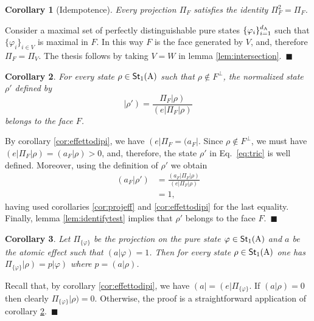 \documentclass[12pt,aps,pra,showpacs,groupedaddress]{revtex4-1}
\newtheorem{corollary}{Corollary} \newtheorem{theorem}{Theorem}
\def\Proof{\medskip\par\noindent{\bf Proof. }}
\def\qed{$\,\blacksquare$\par}
\def\Stset{{\mathsf{St}}}
\def\K#1{\left|#1\right)}  \def\B#1{\left(#1\right|}
\def\SC#1#2{\left(#1\right|\left.\!#2\right)}  \def\Tr{{\rm Tr}}
\begin{document}
\begin{corollary}[Idempotence]
  Every projection $\Pi_F$ satisfies the identity
  $\Pi_F^2=\Pi_F$.
  \label{cor:squareproj}
\end{corollary}

\Proof Consider a maximal set of perfectly distinguishable pure states $\{\varphi_i\}_{i=1}^{d_{\rm A}}$
such that $\{\varphi_i\}_{i\in V}$ is maximal in $F$. In this way $F$ is the face generated by $V$,
and, therefore $\Pi_F=\Pi_V$. The thesis follows by taking $V = W$ in lemma \ref{lem:intersection}.  \qed





\begin{corollary}
  For every state $\rho \in \Stset_1 (\rA)$ such that $\rho\not\in F^\perp$, the normalized state
  $\rho'$ defined by
  \begin{equation}
    \K{\rho'} = \frac{\Pi_F  \K \rho}{\B e \Pi_F  \K \rho} 
    \label{eq:tric}
  \end{equation}  belongs to the face $F$.  
  \label{cor:projrho}
\end{corollary}
\Proof By corollary \ref{cor:effettodipi}, we have $\B e \Pi_F =
(a_F|$.  Since $\rho\not\in F^\perp$, we must have
$(e|\Pi_F|\rho)=(a_F|\rho)>0$, and, therefore, the state $\rho'$ in Eq.~\eqref{eq:tric} is well
defined. Moreover, using the definition of $\rho'$ we obtain 
\begin{align*}
\SC {a_F} {\rho'} &= \frac{\B {a_F} \Pi_F \K \rho}{ \B e \Pi_F \K{\rho}}\\
&=1,  
\end{align*}
having used corollaries  \ref{cor:projeff} and \ref{cor:effettodipi} for the last equality.
Finally, lemma
\ref{lem:identifytest} implies that $\rho' $ belongs to the face $F$.
\qed



\begin{corollary}\label{cor:postproj}
  Let $\Pi_{\{\varphi\}}$ be the projection on the pure state $\varphi \in\Stset_1(\rA)$ and $a$ be the atomic effect such that $\SC {a}{\varphi}=1$. Then for
  every state $\rho \in\Stset_1(\rA)$ one has $\Pi_{\{\varphi\}}
  \K{\rho} =  p \K{\varphi} $ where $p =\SC {a} \rho$.
\end{corollary}
\Proof Recall that, by corollary \ref{cor:effettodipi}, we have $\B {a}  =  \B e  \Pi_{\{\varphi\}}$.     If $\SC{a} \rho=0$ then clearly $\Pi_{\{\varphi\}}|\rho)=0$.  Otherwise, the proof is a straightforward application of corollary \ref{cor:projrho}. \qed
\end{document}
